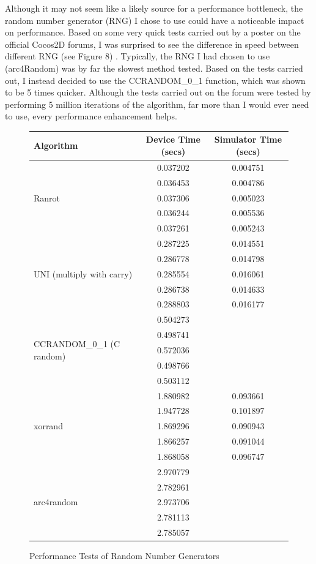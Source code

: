 \documentclass[a4paper,oneside]{report}
\begin{document}
Although it may not seem like a likely source for a performance bottleneck, the random number generator (RNG) I chose to use could have a noticeable impact on performance. Based on some very quick tests carried out by a poster on the official Cocos2D forums, I was surprised to see the difference in speed between different RNG (see Figure 8) \cite{:2011zt}. Typically, the RNG I had chosen to use (arc4Random) was by far the slowest method tested. Based on the tests carried out, I instead decided to use the CCRANDOM\_0\_1 function, which was shown to be 5 times quicker. Although the tests carried out on the forum were tested by performing 5 million iterations of the algorithm, far more than I would ever need to use, every performance enhancement helps.
	
\begin{figure}[h!]
  \centering	
	\begin{tabular}{|l|c|c|}
\hline
Algorithm & Device Time (secs) & Simulator Time (secs)\\ \hline
\multirow{5}{*}{Ranrot} & 0.037202 & 0.004751 \\
 & 0.036453 & 0.004786 \\
 & 0.037306 & 0.005023 \\
 & 0.036244 & 0.005536 \\ 
 & 0.037261 & 0.005243 \\ \hline
\multirow{5}{*}{UNI (multiply with carry)} & 0.287225 & 0.014551 \\
 & 0.286778 & 0.014798 \\
 & 0.285554 & 0.016061 \\
 & 0.286738 & 0.014633 \\
 & 0.288803 & 0.016177 \\ \hline
\multirow{5}{*}{CCRANDOM\_0\_1 (C random)} & 0.504273 &  \\
 & 0.498741 &  \\
 & 0.572036 &  \\
 & 0.498766 &  \\
 & 0.503112 &  \\ \hline
\multirow{5}{*}{xorrand} & 1.880982 & 0.093661 \\
 & 1.947728 & 0.101897 \\
 & 1.869296 & 0.090943 \\
 & 1.866257 & 0.091044 \\
 & 1.868058 & 0.096747 \\ \hline
\multirow{5}{*}{arc4random} & 2.970779 &  \\
 & 2.782961 &  \\
 & 2.973706 &  \\
 & 2.781113 &  \\
 & 2.785057 &  \\ \hline
\end{tabular}    \caption{Performance Tests of Random Number Generators}
\end{figure}
\end{document}
